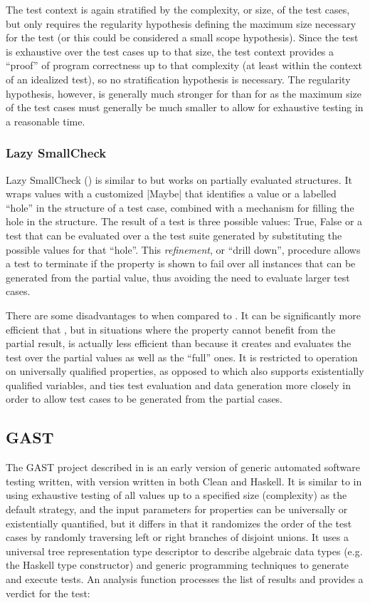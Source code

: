 The \SC test context is again stratified by
the complexity, or size, of the test cases,
but only requires the regularity hypothesis defining 
the maximum size necessary for the test
(or this could be considered a small scope hypothesis).
Since the test is exhaustive over the test cases up to that size,
the test context provides a ``proof'' of program correctness up to that complexity
(at least within the context of an idealized test),
so no stratification hypothesis is necessary.
The regularity hypothesis, however,
is generally much stronger for \SC than for \QC as
the maximum size of the test cases must generally be much smaller
to allow for exhaustive testing in a reasonable time.

\subsubsection{Lazy SmallCheck}

Lazy SmallCheck (\cite{Runcimanetal2008}) is similar to \SC but
works on partially evaluated structures.
It wraps values with a customized |Maybe| that 
identifies a value or a labelled ``hole'' in the structure of a test case, 
combined with a mechanism for filling the hole in the structure.
The result of a test is three possible values:
True, False or a test that can be evaluated over
a the test suite generated by substituting the possible values for that ``hole''.
This \emph{refinement}, or ``drill down'', procedure allows a test 
to terminate if the property is shown to fail over all instances that can be generated from the partial value,
thus avoiding the need to evaluate larger test cases.

There are some disadvantages to \LSC when compared to \SC.
It can be significantly more efficient that \SC,
but in situations where the property cannot benefit from the partial result, 
\LSC is actually less efficient than \SC because 
it creates  and evaluates the test over the partial values as well as the ``full'' ones.
It is restricted to operation on universally qualified properties,
as opposed to \SC which also supports existentially qualified variables,
and \LSC ties test evaluation and data generation more closely
in order to allow test cases to be generated from the partial cases.

\subsection{GAST}

The GAST project described in \cite{GAST2002} is an early version of 
generic automated software testing written,
with version written in both Clean and Haskell.
It is similar to \SC in using exhaustive testing of all values up to a specified size (complexity) as the default strategy,
and the input parameters for properties can be universally or existentially quantified,
but it differs in that it randomizes the order of the test cases
by randomly traversing left or right branches of disjoint unions. 
It uses a universal tree representation type descriptor 
to describe algebraic data types (e.g. the Haskell type constructor) and 
generic programming techniques to generate and execute tests.
An analysis function processes the list of results and provides a verdict for the test:

